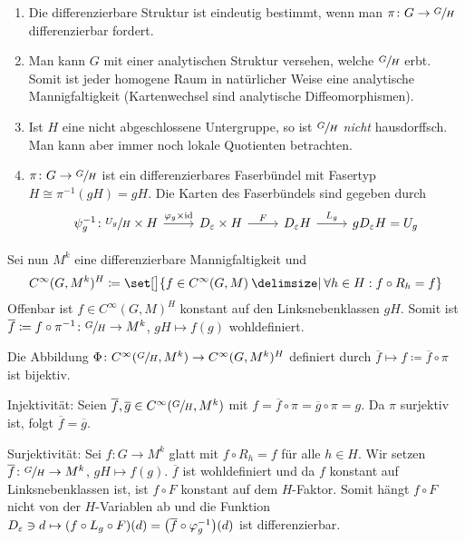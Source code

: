 \begin{bemerkung*}
	\begin{enumerate}[1)]
		\item Die differenzierbare Struktur ist eindeutig bestimmt, wenn man $\pi \colon G \to \sfrac{G}{H}$ differenzierbar fordert.
		\item Man kann $G$ mit einer analytischen Struktur versehen, welche $\sfrac{G}{H}$ erbt.
		Somit ist jeder homogene Raum in natürlicher Weise eine analytische Mannigfaltigkeit (Kartenwechsel sind analytische Diffeomorphismen).
		\item Ist $H$ eine nicht abgeschlossene Untergruppe, so ist $\sfrac{G}{H}$ \emph{nicht} hausdorffsch.
		Man kann aber immer noch lokale Quotienten betrachten.
		\item $\pi \colon G \to \sfrac{G}{H}$ ist ein differenzierbares Faserbündel mit Fasertyp $H \cong \pi^{-1}(gH) = gH$.
		Die Karten des Faserbündels sind gegeben durch
		\[
			\begin{tikzcd}
				\psi_g^{-1} \colon \sfrac{U_g}{H} \times H \rar["\varphi_g \times {\id}"] & D_\varepsilon \times H \rar["F"] & D_\varepsilon H \rar["L_g"] & g D_\varepsilon H = U_g
			\end{tikzcd}
		\]
	\end{enumerate}
\end{bemerkung*}

Sei nun $M^k$ eine differenzierbare Mannigfaltigkeit und 
\[
	C^\infty(G,M^k)^H \coloneqq \set[\big]{f \in C^\infty(G,M) \given \forall h \in H : f \circ R_h = f}
\]
Offenbar ist $f \in C^\infty(G,M)^H$ konstant auf den Linksnebenklassen $g H$.
Somit ist $\overline{f} \coloneqq f \circ \pi^{-1} \colon \sfrac{G}{H} \to M^k$, $gH \mapsto f(g)$ wohldefiniert.

\begin{lemma}[label=lem:313]
	Die Abbildung $\Phi \colon C^\infty(\sfrac{G}{H}, M^k) \to C^\infty(G,M^k)^H$ definiert durch $\overline{f} \mapsto f \coloneqq \overline{f} \circ \pi$ ist bijektiv. 
\end{lemma}
\begin{beweis}
	Injektivität: Seien $\overline{f},\overline{g} \in C^\infty(\sfrac{G}{H},M^k)$ mit $f=\overline{f} \circ \pi = \overline{g} \circ \pi = g$.
	Da $\pi$ surjektiv ist, folgt $\overline{f} = \overline{g}$.
	
	Surjektivität: Sei $f \colon G \to M^k$ glatt mit $f \circ R_h = f$ für alle $h \in H$.
	Wir setzen $\overline{f} \colon \sfrac{G}{H} \to M^k$, $gH \mapsto f(g)$.
	$\overline{f}$ ist wohldefiniert und da $f$ konstant auf Linksnebenklassen ist, ist $f \circ F$ konstant auf dem $H$-Faktor.
	Somit hängt $f \circ F$ nicht von der $H$-Variablen ab und die Funktion $D_\varepsilon \ni d \mapsto (f \circ L_g \circ F)(d) = \enbrace*{\overline{f} \circ \varphi_g^{-1}}(d)$ ist differenzierbar.
\end{beweis}

